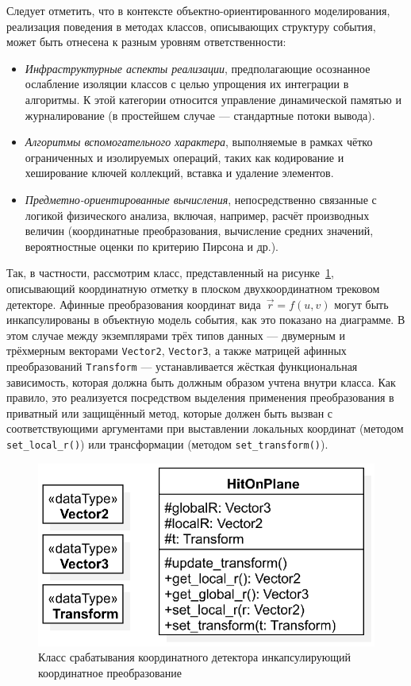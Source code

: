 Следует отметить, что в контексте объектно-ориентированного моделирования,
реализация поведения в методах классов, описывающих структуру события,
может быть отнесена к разным уровням ответственности:

\begin{itemize}
    \item \emph{Инфраструктурные аспекты реализации}, предполагающие
    осознанное ослабление изоляции классов с целью упрощения их интеграции
    в алгоритмы. К этой категории относится управление динамической памятью
    и журналирование (в простейшем случае --- стандартные потоки вывода).
    \item \emph{Алгоритмы вспомогательного характера}, выполняемые
    в рамках чётко ограниченных и изолируемых операций, таких как кодирование
    и хеширование ключей коллекций, вставка и удаление элементов.
    \item \emph{Предметно-ориентированные вычисления}, непосредственно
    связанные с логикой физического анализа, включая, например, расчёт
    производных величин (координатные преобразования, вычисление средних значений,
    вероятностные оценки по критерию Пирсона и др.).
\end{itemize}

Так, в частности, рассмотрим класс, представленный на рисунке~\ref{fig:complex-class},
описывающий координатную отметку в плоском
двухкоординатном трековом детекторе. Афинные преобразования координат
вида~$\vec{r} = f(u, v)$ могут быть инкапсулированы в объектную модель события,
как это показано на диаграмме. В этом случае между экземплярами трёх типов
данных --- двумерным и трёхмерным векторами \texttt{Vector2}, \texttt{Vector3},
а также матрицей афинных преобразований \texttt{Transform} --- устанавливается жёсткая
функциональная зависимость, которая должна быть должным образом учтена
внутри класса. Как правило, это реализуется посредством выделения
применения преобразования в приватный или защищённый метод, которые должен быть
вызван с соответствующими аргументами при выставлении локальных координат
(методом \texttt{set\_local\_r()}) или трансформации (методом \texttt{set\_transform()}).

\begin{figure}[ht!]
    \centering
    \includegraphics[width=0.45\linewidth]{images/illustrative/complex-hit-class.eps}
    \caption{Класс срабатывания координатного детектора инкапсулирующий координатное преобразование}
    \label{fig:complex-class}
\end{figure}

